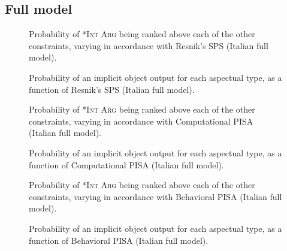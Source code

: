 \subsection{Full model} 


\begin{figure}[H]
\caption{Probability of \textsc{*Int Arg} being ranked above each of the other constraints, varying in accordance with Resnik's SPS (Italian full model).}
    
\end{figure}

\begin{figure}[H]
\caption{Probability of an implicit object output for each aspectual type, as a function of Resnik's SPS (Italian full model).}
    
\end{figure}



\begin{figure}[H]
\caption{Probability of \textsc{*Int Arg} being ranked above each of the other constraints, varying in accordance with Computational PISA (Italian full model).}
    
\end{figure}

\begin{figure}[H]
\caption{Probability of an implicit object output for each aspectual type, as a function of Computational PISA (Italian full model).}
    
\end{figure}



\begin{figure}[H]
\caption{Probability of \textsc{*Int Arg} being ranked above each of the other constraints, varying in accordance with Behavioral PISA (Italian full model).}
    
\end{figure}

\begin{figure}[H]
\caption{Probability of an implicit object output for each aspectual type, as a function of Behavioral PISA (Italian full model).}
    
\end{figure}